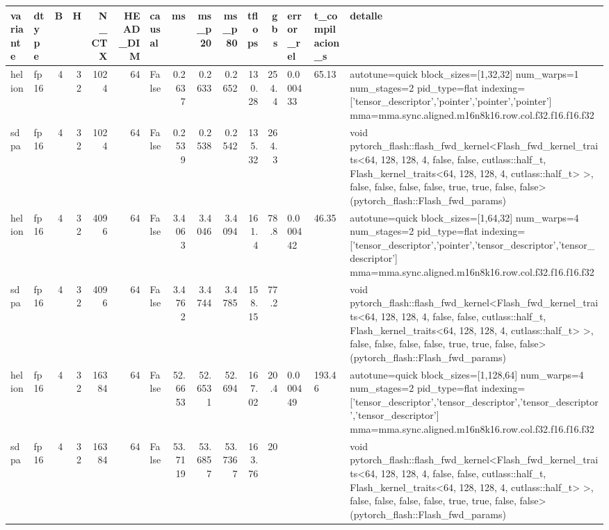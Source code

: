 \begin{table}[htbp]
  \centering\small
  \begin{tabular}{llrrrrlrrrrrlll}
    \toprule
    variante & dtype & B & H & N\_CTX & HEAD\_DIM & causal & ms & ms\_p20 & ms\_p80 & tflops & gbs & error\_rel & t\_compilacion\_s & detalle \\
    \midrule
    helion & fp16 & 4 & 32 & 1024 & 64 & False & 0.2637 & 0.2633 & 0.2652 & 130.28 & 254.4 & 0.000433 & 65.13 & autotune=quick block\_sizes=[1,32,32] num\_warps=1 num\_stages=2 pid\_type=flat indexing=['tensor\_descriptor','pointer','pointer','pointer'] mma=mma.sync.aligned.m16n8k16.row.col.f32.f16.f16.f32 \\
    sdpa & fp16 & 4 & 32 & 1024 & 64 & False & 0.2539 & 0.2538 & 0.2542 & 135.32 & 264.3 &  &  & void pytorch\_flash::flash\_fwd\_kernel<Flash\_fwd\_kernel\_traits<64, 128, 128, 4, false, false, cutlass::half\_t, Flash\_kernel\_traits<64, 128, 128, 4, cutlass::half\_t> >, false, false, false, false, true, true, false, false>(pytorch\_flash::Flash\_fwd\_params) \\
    helion & fp16 & 4 & 32 & 4096 & 64 & False & 3.4063 & 3.4046 & 3.4094 & 161.4 & 78.8 & 0.000442 & 46.35 & autotune=quick block\_sizes=[1,64,32] num\_warps=4 num\_stages=2 pid\_type=flat indexing=['tensor\_descriptor','pointer','tensor\_descriptor','tensor\_descriptor'] mma=mma.sync.aligned.m16n8k16.row.col.f32.f16.f16.f32 \\
    sdpa & fp16 & 4 & 32 & 4096 & 64 & False & 3.4762 & 3.4744 & 3.4785 & 158.15 & 77.2 &  &  & void pytorch\_flash::flash\_fwd\_kernel<Flash\_fwd\_kernel\_traits<64, 128, 128, 4, false, false, cutlass::half\_t, Flash\_kernel\_traits<64, 128, 128, 4, cutlass::half\_t> >, false, false, false, false, true, true, false, false>(pytorch\_flash::Flash\_fwd\_params) \\
    helion & fp16 & 4 & 32 & 16384 & 64 & False & 52.6653 & 52.6531 & 52.694 & 167.02 & 20.4 & 0.000449 & 193.46 & autotune=quick block\_sizes=[1,128,64] num\_warps=4 num\_stages=2 pid\_type=flat indexing=['tensor\_descriptor','tensor\_descriptor','tensor\_descriptor','tensor\_descriptor'] mma=mma.sync.aligned.m16n8k16.row.col.f32.f16.f16.f32 \\
    sdpa & fp16 & 4 & 32 & 16384 & 64 & False & 53.7119 & 53.6857 & 53.7367 & 163.76 & 20 &  &  & void pytorch\_flash::flash\_fwd\_kernel<Flash\_fwd\_kernel\_traits<64, 128, 128, 4, false, false, cutlass::half\_t, Flash\_kernel\_traits<64, 128, 128, 4, cutlass::half\_t> >, false, false, false, false, true, true, false, false>(pytorch\_flash::Flash\_fwd\_params) \\

\end{tabular}
\end{table}

